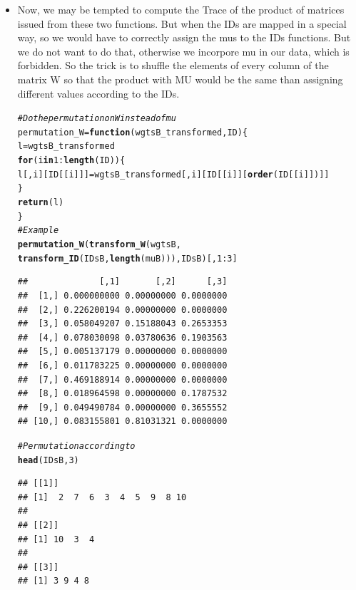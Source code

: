 \documentclass{llncs}\usepackage[]{graphicx}\usepackage[]{color}
\makeatletter
\newcommand{\hlnum}[1]{\textcolor[rgb]{0.686,0.059,0.569}{#1}}%
\newcommand{\hlcom}[1]{\textcolor[rgb]{0.678,0.584,0.686}{\textit{#1}}}%
\newcommand{\hlopt}[1]{\textcolor[rgb]{0,0,0}{#1}}%
\newcommand{\hlstd}[1]{\textcolor[rgb]{0.345,0.345,0.345}{#1}}%
\newcommand{\hlkwa}[1]{\textcolor[rgb]{0.161,0.373,0.58}{\textbf{#1}}}%
\newcommand{\hlkwb}[1]{\textcolor[rgb]{0.69,0.353,0.396}{#1}}%
\newcommand{\hlkwc}[1]{\textcolor[rgb]{0.333,0.667,0.333}{#1}}%
\newcommand{\hlkwd}[1]{\textcolor[rgb]{0.737,0.353,0.396}{\textbf{#1}}}%
\newenvironment{kframe}{%
 \def\at@end@of@kframe{}%
 \ifinner\ifhmode%
  \def\at@end@of@kframe{\end{minipage}}%
  \begin{minipage}{\columnwidth}%
 \fi\fi%
 \def\FrameCommand##1{\hskip\@totalleftmargin \hskip-\fboxsep
 \colorbox{shadecolor}{##1}\hskip-\fboxsep
     \hskip-\linewidth \hskip-\@totalleftmargin \hskip\columnwidth}%
 \MakeFramed {\advance\hsize-\width
   \@totalleftmargin\z@ \linewidth\hsize
   \@setminipage}}%
 {\par\unskip\endMakeFramed%
 \at@end@of@kframe}
\newenvironment{knitrout}{}{} %
\makeatother
\begin{document}
\begin {itemize}
\item Now, we may be tempted to compute the Trace of the product of matrices issued from these two functions. But when the IDs are mapped in a special way, so we would have to correctly assign the mus to the IDs functions. But we do not want to do that, otherwise we incorpore mu in our data, which is forbidden. So the trick is to shuffle the elements of every column of the matrix W so that the product with MU would be the same than assigning different values according to the IDs.
\begin{knitrout}
\color{fgcolor}\begin{kframe}
\begin{alltt}
\hlcom{# Do the permutation on W instead of mu}
\hlstd{permutation_W} \hlkwb{=} \hlkwa{function}\hlstd{(}\hlkwc{wgtsB_transformed}\hlstd{,}\hlkwc{ID}\hlstd{)\{}
  \hlstd{l}\hlkwb{=}\hlstd{wgtsB_transformed}
  \hlkwa{for} \hlstd{(i} \hlkwa{in} \hlnum{1}\hlopt{:}\hlkwd{length}\hlstd{(ID))\{}
    \hlstd{l[,i][ID[[i]]]}\hlkwb{=}\hlstd{wgtsB_transformed[,i][ID[[i]][}\hlkwd{order}\hlstd{(ID[[i]])]]}
  \hlstd{\}}
  \hlkwd{return}\hlstd{(l)}
\hlstd{\}}
\hlcom{# Example}
\hlkwd{permutation_W}\hlstd{(}\hlkwd{transform_W}\hlstd{(wgtsB,}
                          \hlkwd{transform_ID}\hlstd{(IDsB,}\hlkwd{length}\hlstd{(muB))),IDsB)[,}\hlnum{1}\hlopt{:}\hlnum{3}\hlstd{]}
\end{alltt}
\begin{lstlisting}[basicstyle=\ttfamily,breaklines=true]
##              [,1]       [,2]      [,3]
##  [1,] 0.000000000 0.00000000 0.0000000
##  [2,] 0.226200194 0.00000000 0.0000000
##  [3,] 0.058049207 0.15188043 0.2653353
##  [4,] 0.078030098 0.03780636 0.1903563
##  [5,] 0.005137179 0.00000000 0.0000000
##  [6,] 0.011783225 0.00000000 0.0000000
##  [7,] 0.469188914 0.00000000 0.0000000
##  [8,] 0.018964598 0.00000000 0.1787532
##  [9,] 0.049490784 0.00000000 0.3655552
## [10,] 0.083155801 0.81031321 0.0000000
\end{lstlisting}
\begin{alltt}
\hlcom{# Permutation according to}
\hlkwd{head}\hlstd{(IDsB,}\hlnum{3}\hlstd{)}
\end{alltt}
\begin{lstlisting}[basicstyle=\ttfamily,breaklines=true]
## [[1]]
## [1]  2  7  6  3  4  5  9  8 10
## 
## [[2]]
## [1] 10  3  4
## 
## [[3]]
## [1] 3 9 4 8
\end{lstlisting}
\end{kframe}
\end{knitrout}


\end{itemize}
\end{document}
